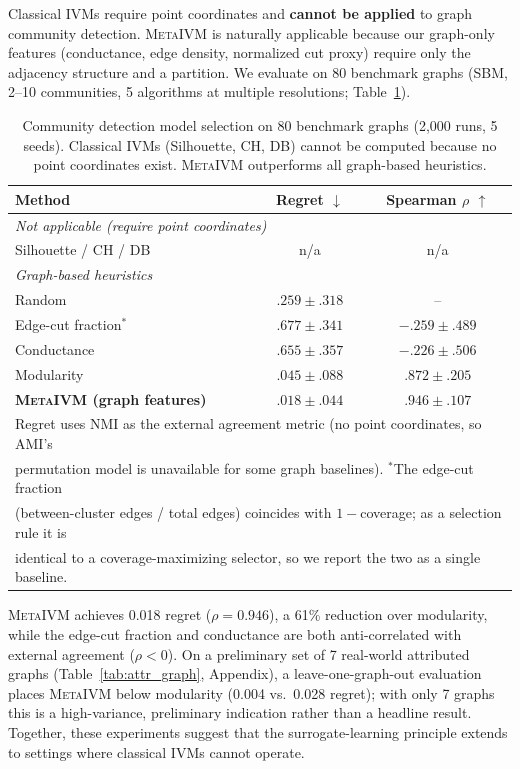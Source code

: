 \documentclass[10pt]{article} %
\newcommand{\ours}{\textsc{MetaIVM}}
\begin{document}
Classical IVMs require point coordinates and \textbf{cannot be applied} to graph community detection. \ours{} is naturally applicable because our graph-only features (conductance, edge density, normalized cut proxy) require only the adjacency structure and a partition. We evaluate on 80 benchmark graphs (SBM, 2--10 communities, 5 algorithms at multiple resolutions; Table~\ref{tab:graph_community}).

\begin{table}[t]
\centering
\caption{Community detection model selection on 80 benchmark graphs (2,000 runs, 5 seeds). Classical IVMs (Silhouette, CH, DB) cannot be computed because no point coordinates exist. \ours{} outperforms all graph-based heuristics.}
\label{tab:graph_community}
\small
\begin{tabular}{lcc}
\toprule
\textbf{Method} & \textbf{Regret} $\downarrow$ & \textbf{Spearman} $\rho$ $\uparrow$ \\
\midrule
\multicolumn{3}{l}{\textit{Not applicable (require point coordinates)}} \\
Silhouette / CH / DB & n/a & n/a \\
\midrule
\multicolumn{3}{l}{\textit{Graph-based heuristics}} \\
Random & $.259 \pm .318$ & -- \\
Edge-cut fraction$^\ast$ & $.677 \pm .341$ & $-.259 \pm .489$ \\
Conductance & $.655 \pm .357$ & $-.226 \pm .506$ \\
Modularity & $.045 \pm .088$ & $.872 \pm .205$ \\
\midrule
\textbf{\ours{} (graph features)} & $\mathbf{.018 \pm .044}$ & $\mathbf{.946 \pm .107}$ \\
\bottomrule
\multicolumn{3}{l}{\footnotesize Regret uses NMI as the external agreement metric (no point coordinates, so AMI's} \\
\multicolumn{3}{l}{\footnotesize permutation model is unavailable for some graph baselines). $^\ast$The edge-cut fraction} \\
\multicolumn{3}{l}{\footnotesize (between-cluster edges / total edges) coincides with $1-$coverage; as a selection rule it is} \\
\multicolumn{3}{l}{\footnotesize identical to a coverage-maximizing selector, so we report the two as a single baseline.} \\
\end{tabular}
\end{table}

\ours{} achieves 0.018 regret ($\rho = 0.946$), a 61\% reduction over modularity, while the edge-cut fraction and conductance are both anti-correlated with external agreement ($\rho < 0$). On a preliminary set of 7 real-world attributed graphs (Table~\ref{tab:attr_graph}, Appendix), a leave-one-graph-out evaluation places \ours{} below modularity (0.004 vs.\ 0.028 regret); with only 7 graphs this is a high-variance, preliminary indication rather than a headline result. Together, these experiments suggest that the surrogate-learning principle extends to settings where classical IVMs cannot operate.
\end{document}
